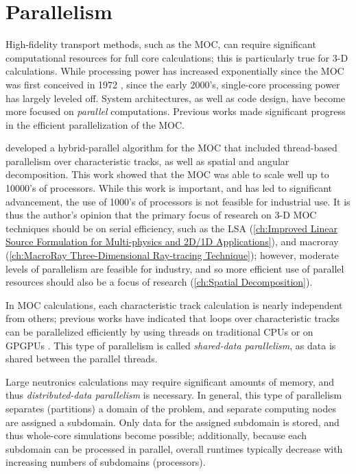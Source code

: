{    \section{Parallelism}{\label{sec:MOC:Parallelism}
        High-fidelity transport methods, such as the \ac{MOC}, can require significant computational resources for full core calculations; this is particularly true for 3-D calculations.
        While processing power has increased exponentially since the \ac{MOC} was first conceived in 1972 \cite{Askew1972}, since the early 2000's, single-core processing power has largely leveled off.
        System architectures, as well as code design, have become more focused on \emph{parallel} computations.
        Previous works \cite{Kochunas2013} made significant progress in the efficient parallelization of the \ac{MOC}.

        \citet{Kochunas2013} developed a hybrid-parallel algorithm for the \ac{MOC} that included thread-based parallelism over characteristic tracks, as well as spatial and angular decomposition.
        This work showed that the \ac{MOC} was able to scale well up to 10000's of processors.
        While this work is important, and has led to significant advancement, the use of 1000's of processors is not feasible for industrial use.
        It is thus the author's opinion that the primary focus of research on 3-D \ac{MOC} techniques should be on serial efficiency, such as the \acf{LSA} (\cref{ch:Improved Linear Source Formulation for Multi-physics and 2D/1D Applications}), and macroray (\cref{ch:MacroRay Three-Dimensional Ray-tracing Technique});
        however, moderate levels of parallelism are feasible for industry, and so more efficient use of parallel resources should also be a focus of research (\cref{ch:Spatial Decomposition}).

        In \ac{MOC} calculations, each characteristic track calculation is nearly independent from others; previous works have indicated that loops over characteristic tracks can be parallelized efficiently by using threads on traditional \acp{CPU} \cite{Kochunas2013} or on \acp{GPGPU} \cite{Boyd2014}.
        This type of parallelism is called \emph{shared-data parallelism}, as data is shared between the parallel threads.

        Large neutronics calculations may require significant amounts of memory, and thus \emph{distributed-data parallelism} is necessary.
        In general, this type of parallelism separates (partitions) a domain of the problem, and separate computing nodes are assigned a subdomain.
        Only data for the assigned subdomain is stored, and thus whole-core simulations become possible; additionally, because each subdomain can be processed in parallel, overall runtimes typically decrease with increasing numbers of subdomains (processors).

}}
